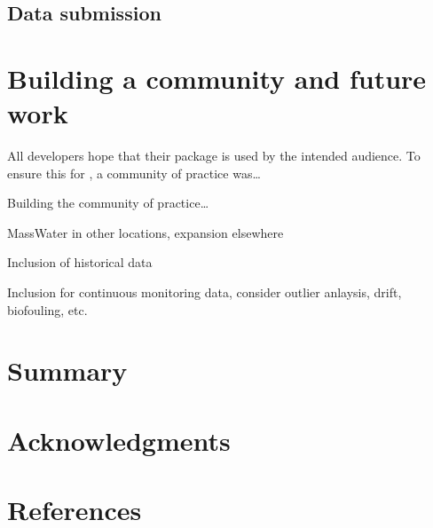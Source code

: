 \hypertarget{data-submission}{%
\subsection{Data submission}\label{data-submission}}

\hypertarget{building-a-community-and-future-work}{%
\section{Building a community and future work}\label{building-a-community-and-future-work}}

All developers hope that their package is used by the intended audience. To ensure this for , a community of practice was\ldots{}

Building the community of practice\ldots{}

MassWater in other locations, expansion elsewhere

Inclusion of historical data

Inclusion for continuous monitoring data, consider outlier anlaysis, drift, biofouling, etc.

\hypertarget{summary}{%
\section{Summary}\label{summary}}

\hypertarget{acknowledgments}{%
\section{Acknowledgments}\label{acknowledgments}}

\hypertarget{references}{%
\section*{References}\label{references}}


